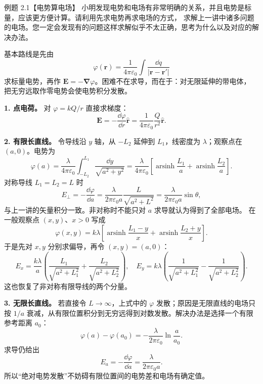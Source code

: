 \begin{origexamplebox}{例题 2.1【电势算电场】}
小明发现电势和电场有非常明确的关系，并且电势是标量，应该更方便计算。请利用先求电势再求电场的方式，
求解上一讲中诸多问题的电场。您一定会发现有的问题这样求解似乎不太正确，思考为什么以及对应的解决办法。
\end{origexamplebox}

\begin{xesolution}
基本路线是先由
\[
  \varphi(\boldsymbol r)=\frac{1}{4\pi\varepsilon_0}
  \int\frac{\dd q}{|\boldsymbol r-\boldsymbol r'|}
\]
求标量电势，再作 $\boldsymbol E=-\boldsymbol\nabla\varphi$。困难不在求导，而在于：对无限延伸的带电体，
把无穷远取作零电势会使电势积分发散。

\potentialMethodFigure

\textbf{1. 点电荷。} 对 $\varphi=kQ/r$ 直接求梯度：
\[
  \boldsymbol E=-\frac{\dd\varphi}{\dd r}\hat{\boldsymbol r}
  =\boxed{\frac{1}{4\pi\varepsilon_0}\frac{Q}{r^2}\hat{\boldsymbol r}}.
\]

\textbf{2. 有限长直线。} 令导线沿 $y$ 轴，从 $-L_2$ 延伸到 $L_1$，线密度为 $\lambda$；观察点在
$(a,0)$。电势为
\[
  \varphi(a)=\frac{\lambda}{4\pi\varepsilon_0}
  \int_{-L_2}^{L_1}\frac{\dd y}{\sqrt{a^2+y^2}}
  =\frac{\lambda}{4\pi\varepsilon_0}
  \left[\operatorname{arsinh}\frac{L_1}{a}
  +\operatorname{arsinh}\frac{L_2}{a}\right].
\]
对称导线 $L_1=L_2=L$ 时
\[
  E_\perp=-\frac{\dd\varphi}{\dd a}
  =\frac{\lambda}{2\pi\varepsilon_0a}
  \frac{L}{\sqrt{a^2+L^2}}
  =\boxed{\frac{\lambda}{2\pi\varepsilon_0a}\sin\theta},
\]
与上一讲的矢量积分一致。非对称时不能只对 $a$ 求导就认为得到了全部电场。
在一般观察点 $(x,y)$、$x>0$ 写成
\[
 \varphi(x,y)=k\lambda\left[\operatorname{arsinh}\frac{L_1-y}{x}
 +\operatorname{arsinh}\frac{L_2+y}{x}\right].
\]
于是先对 $x,y$ 分别求偏导，再令 $(x,y)=(a,0)$：
\[
 E_x=\frac{k\lambda}{a}\left(\frac{L_1}{\sqrt{a^2+L_1^2}}+
 \frac{L_2}{\sqrt{a^2+L_2^2}}\right),\quad
 E_y=k\lambda\left(\frac1{\sqrt{a^2+L_1^2}}-\frac1{\sqrt{a^2+L_2^2}}\right).
\]
这也恢复了非对称有限导线的两个分量。

\textbf{3. 无限长直线。} 若直接令 $L\to\infty$，上式中的 $\varphi$ 发散；原因是无限直线的电场只按
$1/a$ 衰减，从有限位置积分到无穷远得到对数发散。解决办法是选择一个有限参考距离 $a_0$：
\[
  \boxed{\varphi(a)-\varphi(a_0)
  =-\frac{\lambda}{2\pi\varepsilon_0}\ln\frac{a}{a_0}}.
\]
求导仍给出
\[
  \boxed{E_a=-\frac{\dd\varphi}{\dd a}
  =\frac{\lambda}{2\pi\varepsilon_0a}}.
\]
所以“绝对电势发散”不妨碍有限位置间的电势差和电场有确定值。


\end{xesolution}
